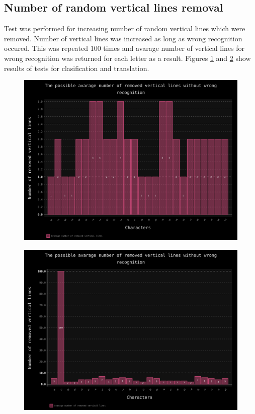 \documentclass[a4paper]{article}
\begin{document}
\clearpage
\subsection{Number of random vertical lines removal}
Test was performed for increasing number of random vertical lines which were removed. Number of vertical lines was increased as long as wrong recognition occured. This was repeated 100 times and avarage number of vertical lines for wrong recognition was returned for each letter as a result. Figures \ref{ver_lines_trans} and \ref{ver_lines_clas} show results of tests for clasification and translation. 
\begin{figure}[ht]
	\centering
	\includegraphics[scale=0.7,keepaspectratio=true]{Charts/LinesVerTestPlanResultsChart_NormalTester.png}	
	\caption{}
	\label{ver_lines_trans}
\end{figure}

\begin{figure}[t]
	\centering
	\includegraphics[scale=0.7,keepaspectratio=true]{Charts/LinesVerTestPlanResultsChart_ClasifierTester.png}	
	\caption{}
	\label{ver_lines_clas}
\end{figure}
\end{document}
